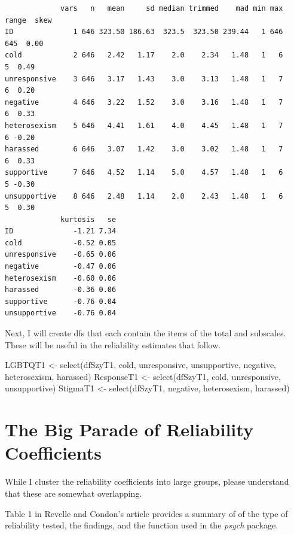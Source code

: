 \documentclass[
  english,
]{book}
\newenvironment{Shaded}{\begin{snugshade}}{\end{snugshade}}
\newcommand{\FunctionTok}[1]{\textcolor[rgb]{0.00,0.00,0.00}{#1}}
\newcommand{\NormalTok}[1]{#1}
\newcommand{\OtherTok}[1]{\textcolor[rgb]{0.56,0.35,0.01}{#1}}
\begin{document}
\begin{verbatim}
             vars   n   mean     sd median trimmed    mad min max range  skew
ID              1 646 323.50 186.63  323.5  323.50 239.44   1 646   645  0.00
cold            2 646   2.42   1.17    2.0    2.34   1.48   1   6     5  0.49
unresponsive    3 646   3.17   1.43    3.0    3.13   1.48   1   7     6  0.20
negative        4 646   3.22   1.52    3.0    3.16   1.48   1   7     6  0.33
heterosexism    5 646   4.41   1.61    4.0    4.45   1.48   1   7     6 -0.20
harassed        6 646   3.07   1.42    3.0    3.02   1.48   1   7     6  0.33
supportive      7 646   4.52   1.14    5.0    4.57   1.48   1   6     5 -0.30
unsupportive    8 646   2.48   1.14    2.0    2.43   1.48   1   6     5  0.30
             kurtosis   se
ID              -1.21 7.34
cold            -0.52 0.05
unresponsive    -0.65 0.06
negative        -0.47 0.06
heterosexism    -0.60 0.06
harassed        -0.36 0.06
supportive      -0.76 0.04
unsupportive    -0.76 0.04
\end{verbatim}

Next, I will create dfs that each contain the items of the total and subscales. These will be useful in the reliability estimates that follow.

\begin{Shaded}
\begin{Highlighting}[]
\NormalTok{LGBTQT1 }\OtherTok{\textless{}{-}} \FunctionTok{select}\NormalTok{(dfSzyT1, cold, unresponsive, unsupportive, negative, heterosexism, harassed)}
\NormalTok{ResponseT1 }\OtherTok{\textless{}{-}} \FunctionTok{select}\NormalTok{(dfSzyT1, cold, unresponsive, unsupportive)}
\NormalTok{StigmaT1 }\OtherTok{\textless{}{-}} \FunctionTok{select}\NormalTok{(dfSzyT1, negative, heterosexism, harassed)}
\end{Highlighting}
\end{Shaded}

\hypertarget{the-big-parade-of-reliability-coefficients}{%
\section{The Big Parade of Reliability Coefficients}\label{the-big-parade-of-reliability-coefficients}}

While I cluster the reliability coefficients into large groups, please understand that these are somewhat overlapping.

Table 1 in Revelle and Condon's \citeyearpar{revelle_reliability_2019-1} article provides a summary of of the type of reliability tested, the findings, and the function used in the \emph{psych} package.
\end{document}
